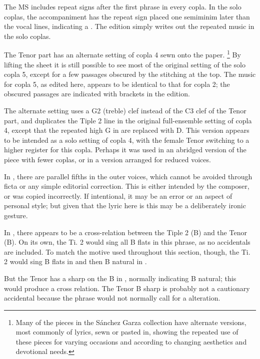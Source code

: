 The MS includes repeat signs after the first phrase in every copla. 
In the solo coplas, the accompaniment has the repeat sign placed one semiminim later than the vocal lines, indicating a .
The edition simply writes out the repeated music in the solo coplas.

The Tenor part has an alternate setting of copla 4 sewn onto the paper.%
  \footnote{Many of the pieces in the Sánchez Garza collection have alternate versions, most commonly of lyrics, sewn or pasted in, showing the repeated use of these pieces for varying occasions and according to changing aesthetics and devotional needs.}
By lifting the sheet it is still possible to see most of the original setting of the solo copla 5, except for a few passages obscured by the stitching at the top.
The music for copla 5, as edited here, appears to be identical to that for copla 2; the obscured passages are indicated with brackets in the edition.

The alternate setting uses a G2 (treble) clef instead of the C3 clef of the Tenor part, and duplicates the Tiple 2 line in the original full-ensemble setting of copla 4, except that the repeated high G in  are replaced with D.
This version appears to be intended as a solo setting of copla 4, with the female Tenor switching to a higher register for this copla. 
Perhaps it was used in an abridged version of the piece with fewer coplas, or in a version arranged for reduced voices.



In , there are parallel fifths in the outer voices, which cannot be avoided through ficta or any simple editorial correction. 
This is either intended by the composer, or was copied incorrectly.
If intentional, it may be an error or an aspect of personal style; but given that the lyric here is  this may be a deliberately ironic gesture.

In , there appears to be a cross-relation between the Tiple 2 (B\fl) and the Tenor (B\na).
On its own, the Ti. 2 would sing all B flats in this phrase, as no accidentals are included.
To match the motive used throughout this section, though, the Ti. 2 would sing B flats in  and then B natural in .

But the Tenor has a sharp on the B in , normally indicating B natural; this would produce a cross relation.
The Tenor B sharp is probably not a cautionary accidental because the phrase would not normally call for a  alteration.

